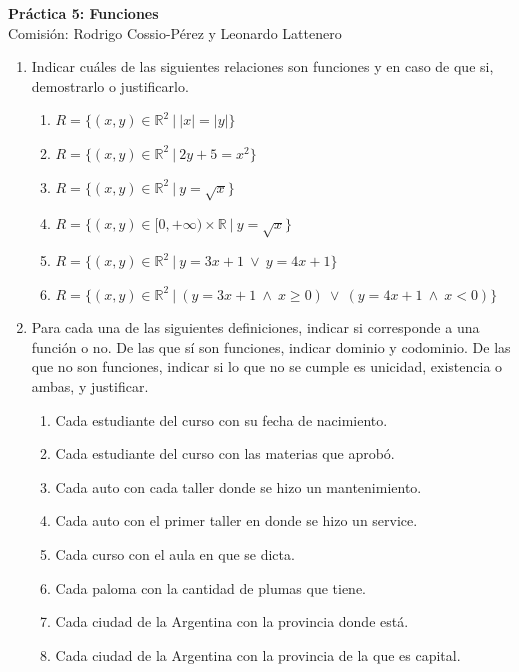 \documentclass[a4paper]{article}
\newcommand{\exercise}{\item}
\begin{document}
\noindent \hrulefill 
\vspace{-7pt}
\begin{center} 
	\textbf{ Práctica 5: Funciones} \\
	Comisión: Rodrigo Cossio-Pérez y Leonardo Lattenero
\end{center}
\vspace{-10pt}
\hrulefill
\begin{enumerate}
	\exercise Indicar cuáles de las siguientes relaciones son funciones y en caso de que si, demostrarlo o justificarlo.
	\begin{enumerate} [label=(\alph*)]
		\item $R=\{(x,y)\in\mathbb{R}^2 ~|~ |x|=|y|\}$
		\item $R=\{(x,y)\in\mathbb{R}^2 ~|~ 2y+5=x^2 \}$
		\item $R=\{(x,y)\in\mathbb{R}^2 ~|~ y=\sqrt{x} \}$
		\item $R=\{(x,y)\in [0,+\infty)\times\mathbb{R} ~|~ y=\sqrt{x} \}$
		\item $R=\{(x,y)\in\mathbb{R}^2 ~|~ y=3x+1 ~\lor~ y=4x+1 \}$
		\item $R=\{(x,y)\in\mathbb{R}^2 ~|~ (y=3x+1 ~\land~ x\geq0) ~\lor~ (y=4x+1 ~\land~ x<0) \}$
	\end{enumerate}
	\exercise Para cada una de las siguientes definiciones, indicar si corresponde a una función o no. De las que sí son funciones, indicar dominio y codominio. De las que no son funciones, indicar si lo que no se cumple es unicidad, existencia o ambas, y justificar.
	\begin{enumerate} [label=(\alph*)]
		\item Cada estudiante del curso con su fecha de nacimiento.
		\item Cada estudiante del curso con las materias que aprobó.
		\item Cada auto con cada taller donde se hizo un mantenimiento.
		\item Cada auto con el primer taller en donde se hizo un service.
		\item Cada curso con el aula en que se dicta.
		\item Cada paloma con la cantidad de plumas que tiene.
		\item Cada ciudad de la Argentina con la provincia donde está.
		\item Cada ciudad de la Argentina con la provincia de la que es capital.

\end{enumerate}
\end{enumerate}
\end{document}
